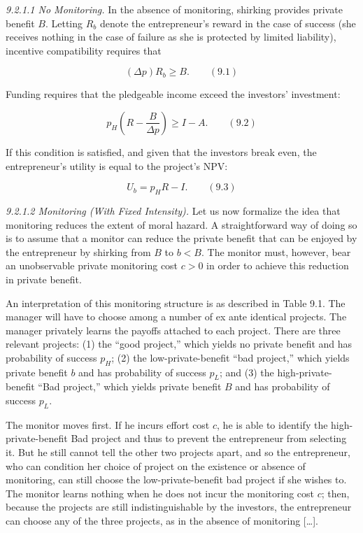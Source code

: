 \documentclass[11pt,a4paper]{article}
\begin{document}
\emph{9.2.1.1 No Monitoring.} In the absence of monitoring, shirking provides private benefit \(B\).
Letting \(R_b\) denote the entrepreneur's reward in the case of success (she receives nothing in the
case of failure as she is protected by limited liability), incentive compatibility requires that

\[(\Delta p)R_b \geqslant B. \qquad (9.1)\]

Funding requires that the pledgeable income exceed the investors' investment:

\[p_H\left(R - \frac{B}{\Delta p}\right) \geqslant I - A. \qquad (9.2)\]

If this condition is satisfied, and given that the investors break even, the entrepreneur's utility
is equal to the project's NPV:

\[U_b = p_H R - I. \qquad (9.3)\]

\emph{9.2.1.2 Monitoring (With Fixed Intensity).} Let us now formalize the idea that monitoring
reduces the extent of moral hazard. A straightforward way of doing so is to assume that a monitor
can reduce the private benefit that can be enjoyed by the entrepreneur by shirking from \(B\) to
\(b < B\). The monitor must, however, bear an unobservable private monitoring cost \(c > 0\) in
order to achieve this reduction in private benefit.

An interpretation of this monitoring structure is as described in Table 9.1. The manager will have
to choose among a number of ex ante identical projects. The manager privately learns the payoffs
attached to each project. There are three relevant projects: (1) the ``good project,'' which yields
no private benefit and has probability of success \(p_H\); (2) the low-private-benefit ``bad
project,'' which yields private benefit \(b\) and has probability of success \(p_L\); and (3) the
high-private-benefit ``Bad project,'' which yields private benefit \(B\) and has probability of
success \(p_L\).

The monitor moves first. If he incurs effort cost \(c\), he is able to identify the
high-private-benefit Bad project and thus to prevent the entrepreneur from selecting it. But he
still cannot tell the other two projects apart, and so the entrepreneur, who can condition her
choice of project on the existence or absence of monitoring, can still choose the
low-private-benefit bad project if she wishes to. The monitor learns nothing when he does not incur
the monitoring cost \(c\); then, because the projects are still indistinguishable by the investors,
the entrepreneur can choose any of the three projects, as in the absence of monitoring {[}\ldots{]}.
\end{document}
